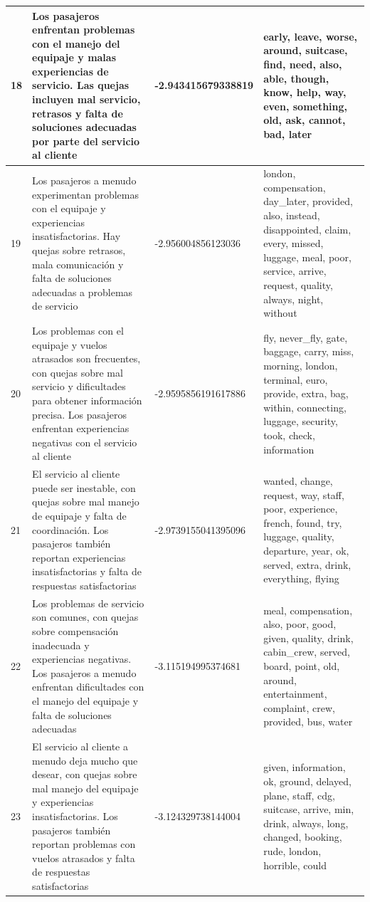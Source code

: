 \documentclass{report}
\begin{document}
\begin{longtable}{|p{1cm}|p{4cm}|p{4cm}|p{6cm}|}
                    \hline
                    18 & Los pasajeros enfrentan problemas con el manejo del equipaje y malas experiencias de servicio. Las quejas incluyen mal servicio, retrasos y falta de soluciones adecuadas por parte del servicio al cliente & -2.943415679338819 & early, leave, worse, around, suitcase, find, need, also, able, though, know, help, way, even, something, old, ask, cannot, bad, later \\
                    \hline
                    19 & Los pasajeros a menudo experimentan problemas con el equipaje y experiencias insatisfactorias. Hay quejas sobre retrasos, mala comunicación y falta de soluciones adecuadas a problemas de servicio & -2.956004856123036 & london, compensation, day\_later, provided, also, instead, disappointed, claim, every, missed, luggage, meal, poor, service, arrive, request, quality, always, night, without \\
                    \hline
                    20 & Los problemas con el equipaje y vuelos atrasados son frecuentes, con quejas sobre mal servicio y dificultades para obtener información precisa. Los pasajeros enfrentan experiencias negativas con el servicio al cliente & -2.9595856191617886 & fly, never\_fly, gate, baggage, carry, miss, morning, london, terminal, euro, provide, extra, bag, within, connecting, luggage, security, took, check, information \\
                    \hline
                    21 & El servicio al cliente puede ser inestable, con quejas sobre mal manejo de equipaje y falta de coordinación. Los pasajeros también reportan experiencias insatisfactorias y falta de respuestas satisfactorias & -2.9739155041395096 & wanted, change, request, way, staff, poor, experience, french, found, try, luggage, quality, departure, year, ok, served, extra, drink, everything, flying \\
                    \hline
                    22 & Los problemas de servicio son comunes, con quejas sobre compensación inadecuada y experiencias negativas. Los pasajeros a menudo enfrentan dificultades con el manejo del equipaje y falta de soluciones adecuadas & -3.115194995374681 & meal, compensation, also, poor, good, given, quality, drink, cabin\_crew, served, board, point, old, around, entertainment, complaint, crew, provided, bus, water \\
                    \hline
                    23 & El servicio al cliente a menudo deja mucho que desear, con quejas sobre mal manejo del equipaje y experiencias insatisfactorias. Los pasajeros también reportan problemas con vuelos atrasados y falta de respuestas satisfactorias & -3.124329738144004 & given, information, ok, ground, delayed, plane, staff, cdg, suitcase, arrive, min, drink, always, long, changed, booking, rude, london, horrible, could \\

\end{longtable}
\end{document}
